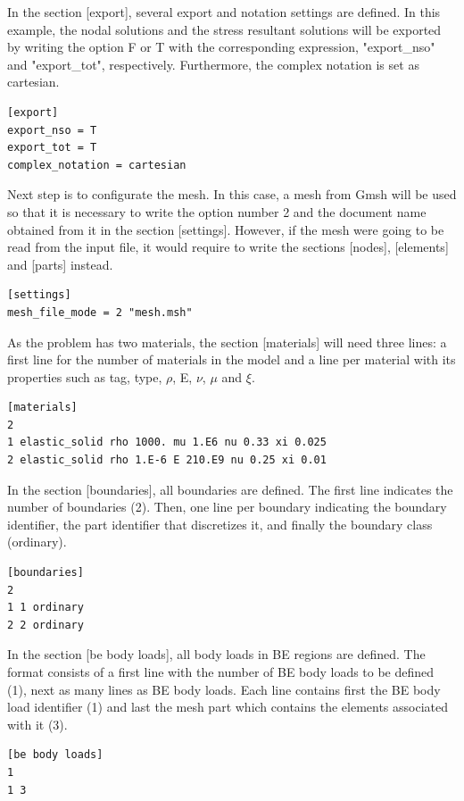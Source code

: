 \documentclass[a4]{article}
\begin{document}
In the section [export], several export and notation settings are defined. In this example, the nodal solutions and the stress resultant solutions will be exported by writing the option F or T with the corresponding expression, "export\_nso" and "export\_tot", respectively. Furthermore, the complex notation is set as cartesian. 


\begin{Verbatim}
[export]
export_nso = T
export_tot = T
complex_notation = cartesian
\end{Verbatim}

Next step is to configurate the mesh. In this case, a mesh from Gmsh will be used so that it is necessary to write the option number 2 and the document name obtained from it in the section [settings]. However, if the mesh were going to be read from the input file, it would require to write the sections [nodes], [elements] and [parts] instead.

\begin{Verbatim}	
[settings]
mesh_file_mode = 2 "mesh.msh"
\end{Verbatim}

As the problem has two materials, the section [materials] will need three lines: a first line for the number of materials in the model and a line per material with its properties such as tag, type, $\rho$, E, $\nu$, $\mu$ and $ \xi $.

\begin{Verbatim}
[materials]
2
1 elastic_solid rho 1000. mu 1.E6 nu 0.33 xi 0.025
2 elastic_solid rho 1.E-6 E 210.E9 nu 0.25 xi 0.01
\end{Verbatim}

In the section [boundaries], all boundaries are defined. The first line indicates the number of boundaries (2). Then, one line per boundary indicating the boundary identifier, the part identifier that discretizes it, and finally the boundary class (ordinary).

\begin{Verbatim}
[boundaries]
2
1 1 ordinary
2 2 ordinary
\end{Verbatim}

In the section [be body loads], all body loads in BE regions are defined. The format consists of a first line with the number of BE body loads to be defined (1), next as many lines as BE body loads. Each line contains first the BE body load identifier (1) and last the mesh part which contains the elements associated with it (3).

\begin{Verbatim}
[be body loads]
1
1 3
\end{Verbatim}
\end{document}
